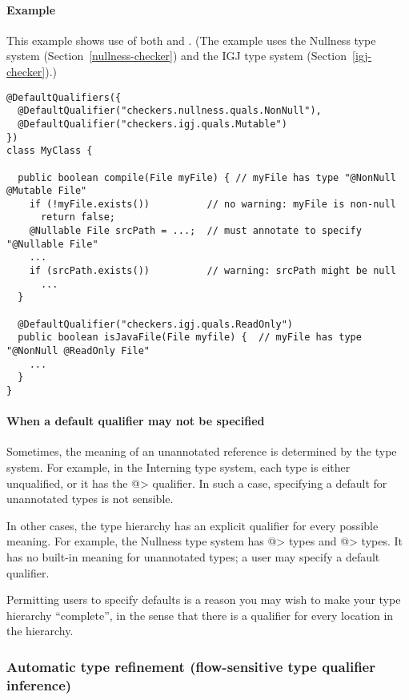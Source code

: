 \paragraph{Example}
This example shows use of both 
and .  (The example uses
the Nullness type system (Section~\ref{nullness-checker}) and
the IGJ type system (Section~\ref{igj-checker}).)

\begin{Verbatim}
@DefaultQualifiers({
  @DefaultQualifier("checkers.nullness.quals.NonNull"),
  @DefaultQualifier("checkers.igj.quals.Mutable")
})
class MyClass {

  public boolean compile(File myFile) { // myFile has type "@NonNull @Mutable File"
    if (!myFile.exists())          // no warning: myFile is non-null
      return false;
    @Nullable File srcPath = ...;  // must annotate to specify "@Nullable File"
    ...
    if (srcPath.exists())          // warning: srcPath might be null
      ...
  }

  @DefaultQualifier("checkers.igj.quals.ReadOnly")
  public boolean isJavaFile(File myfile) {  // myFile has type "@NonNull @ReadOnly File"
    ...
  }
}
\end{Verbatim}



\paragraph{When a default qualifier may not be specified}

Sometimes, the meaning of an unannotated reference is determined by the
type system.  For example, in the Interning type system, each type is
either unqualified, or it has the \<@>
qualifier.  In such a case, specifying a default for unannotated types is
not sensible.

In other cases, the type hierarchy has an explicit qualifier for every
possible meaning.  For example, the Nullness type system has
\<@> types and
\<@> types.  It has no built-in meaning for
unannotated types; a user may specify a default qualifier.

Permitting users to specify defaults is a reason you may wish to make your
type hierarchy ``complete'', in the sense that there is a qualifier for
every location in the hierarchy.


\subsubsection{Automatic type refinement (flow-sensitive type qualifier inference)\label{type-refinement}}

